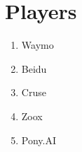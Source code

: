 \section{Players}
\begin{enumerate}
  \item Waymo
  \item Beidu
  \item Cruse
  \item Zoox
  \item Pony.AI
\end{enumerate}